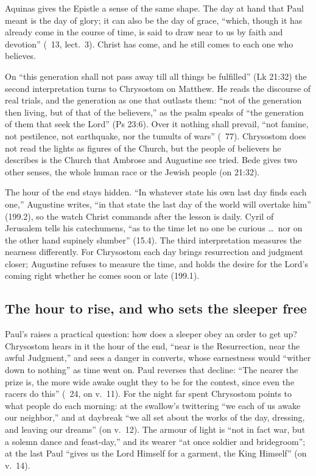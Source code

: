 Aquinas gives the Epistle a sense of the same shape. The day at hand that
Paul meant is the day of glory; it can also be the day of grace, ``which,
though it has already come in the course of time, is said to draw near to us
by faith and devotion'' (~13, lect.~3). Christ has come, and
he still comes to each one who believes.

On ``this generation shall not pass away till all things be fulfilled'' (Lk
21:32) the second interpretation turns to Chrysostom on Matthew. He reads the
discourse of real trials, and the generation as one that outlasts them: ``not
of the generation then living, but of that of the believers,'' as the psalm
speaks of ``the generation of them that seek the Lord'' (Ps 23:6). Over it
nothing shall prevail, ``not famine, not pestilence, not earthquake, nor the
tumults of wars'' (~77). Chrysostom does not read the
lights as figures of the Church, but the people of believers he describes is
the Church that Ambrose and Augustine see tried. Bede gives two other senses,
the whole human race or the Jewish people (on 21:32).

The hour of the end stays hidden. ``In whatever state his own last day finds
each one,'' Augustine writes, ``in that state the last day of the world will
overtake him'' (199.2), so the watch Christ commands after the lesson is
daily. Cyril of Jerusalem tells his catechumens, ``as to the time let no one
be curious \dots\ nor on the other hand supinely slumber'' (15.4). The third
interpretation measures the nearness differently. For Chrysostom each day
brings resurrection and judgment closer; Augustine refuses to measure the
time, and holds the desire for the Lord's coming right whether he comes soon
or late (199.1).

\subsection{The hour to rise, and who sets the sleeper free}

Paul's  raises a practical question:
how does a sleeper obey an order to get up? Chrysostom hears in it the hour of
the end, ``near is the Resurrection, near the awful Judgment,'' and sees a
danger in converts, whose earnestness would ``wither down to nothing'' as time
went on. Paul reverses that decline: ``The nearer the prize is, the more wide
awake ought they to be for the contest, since even the racers do this''
(~24, on v.~11). For the night far spent Chrysostom
points to what people do each morning: at the swallow's twittering ``we each
of us awake our neighbor,'' and at daybreak ``we all set about the works of the day, dressing, and leaving
our dreams'' (on v.~12). The armour of light is ``not in fact war, but a
solemn dance and feast-day,'' and its wearer ``at once soldier and
bridegroom''; at the last Paul ``gives us the Lord Himself for a garment, the
King Himself'' (on v.~14).

